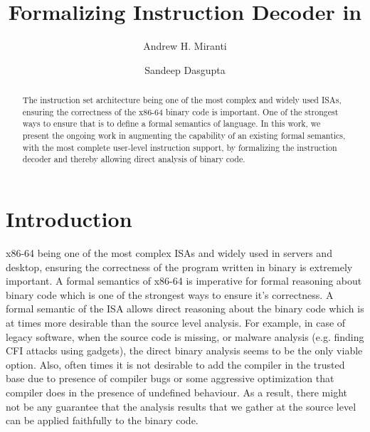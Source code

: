 \documentclass[a4paper,UKenglish,cleveref, autoref]{lipics-v2019}
\title{Formalizing \ISA Instruction Decoder in \K} %
\author{Andrew H. Miranti}{University of Illinois at Urbana Champaign, USA}{miranti2@illinois.edu}{}{}
\author{Sandeep Dasgupta}{University of Illinois at Urbana Champaign, USA}{sdasgup3@illinois.edu}{}{}
\begin{document}
\maketitle

\begin{abstract}
    The \ISA instruction set architecture being one of the
    most complex and widely used ISAs,  ensuring the correctness of the x86-64 binary code is
    important. One of the strongest ways to ensure that is to define a  formal semantics of \ISA language. In this work, we present the ongoing work in augmenting the capability of an existing \ISA formal semantics, with the most complete user-level instruction support, by formalizing the instruction decoder and thereby allowing direct analysis of binary code.
\end{abstract}

\section{Introduction}
\label{sec:intro}
x86-64 being one of the most complex ISAs and widely used in servers and desktop, ensuring the correctness of the program written in binary is extremely important. A formal semantics of x86-64 is imperative for formal reasoning about binary code which is  one of the strongest ways to ensure it's correctness. A formal semantic of the ISA allows direct reasoning about the binary code which is at times more desirable than the source level analysis. For example, in case of legacy software, when the source code is missing, or malware analysis (e.g. finding CFI attacks using gadgets), the direct binary analysis seems to be the only viable option.  Also, often times it is not desirable to add the compiler in the trusted base due to presence of compiler bugs or some aggressive optimization that compiler does in the presence of undefined behaviour. As a result, there might not be any guarantee that the analysis results that we gather at the source level  can be applied faithfully to the binary code.  
\end{document}
